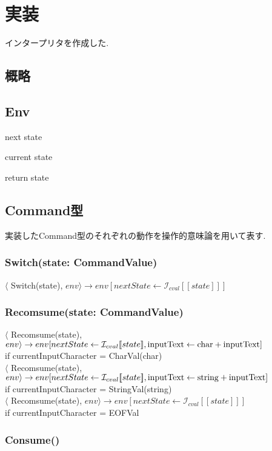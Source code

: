 \documentclass[uplatex,a4j]{jsreport}
\begin{document}
\chapter{実装}
\label{実装}
インタープリタを作成した.
\section{概略}

\section{Env}
next state

current state

return state


\section{Command型}
実装したCommand型のそれぞれの動作を操作的意味論を用いて表す. 
\subsection*{Switch(state: CommandValue)}
$\langle$ Switch(state), $env \rangle \rightarrow env[nextState \leftarrow \mathcal{I}_{cval}[\![state]\!] ]$

\subsection*{Recomsume(state: CommandValue)}
$\langle$ Recomsume(state), $env \rangle \rightarrow env[nextState \leftarrow \mathcal{I}_{cval}[\![state]\!] , {\rm inputText} \leftarrow {\rm char + inputText} ]$\\
 if currentInputCharacter = CharVal(char)\\
$\langle$ Recomsume(state), $env \rangle \rightarrow env[nextState \leftarrow \mathcal{I}_{cval}[\![state]\!] , {\rm inputText} \leftarrow {\rm string + inputText} ]$\\
 if currentInputCharacter = StringVal(string)\\
$\langle$ Recomsume(state), $env \rangle \rightarrow env[nextState \leftarrow \mathcal{I}_{cval}[\![state]\!] ]$\\
 if currentInputCharacter = EOFVal\\

\subsection*{Consume()}
\end{document}
